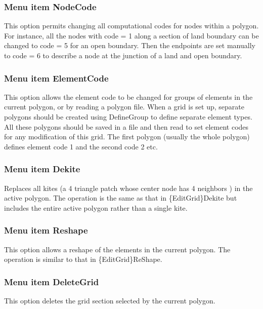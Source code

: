 \documentclass{article}
\begin{document}
\subsubsection[Menu item NodeCode]{Menu item NodeCode}
This option permits changing all computational codes for nodes within a polygon. For instance, all the nodes with code = 1 along a section of land boundary can be changed to code = 5 for an open boundary. Then the endpoints are set manually to code = 6 to describe a node at the junction of a land and open boundary.

\subsubsection[Menu item ElementCode]{Menu item ElementCode}
This option allows the element code to be changed for groups of elements in the current polygon, or by reading a polygon file. When a grid is set up, separate polygons should be created using DefineGroup to define separate element types. All these polygons should be saved in a file and then read to set element codes for any modification of this grid. The first polygon (usually the whole polygon) defines element code 1 and the second code 2 etc.

\subsubsection[Menu item Dekite]{Menu item Dekite}
Replaces all kites (a 4 triangle patch whose center node has 4 neighbors ) in the active polygon. The operation is the same as that in \{EditGrid\}Dekite but includes the entire active polygon rather than a single kite.

\subsubsection[Menu item Reshape]{Menu item Reshape}
This option allows a reshape of the elements in the current polygon. The operation is similar to that in \{EditGrid\}ReShape.

\subsubsection[Menu item DeleteGrid]{Menu item DeleteGrid}
This option deletes the grid section selected by the current polygon.
\end{document}
